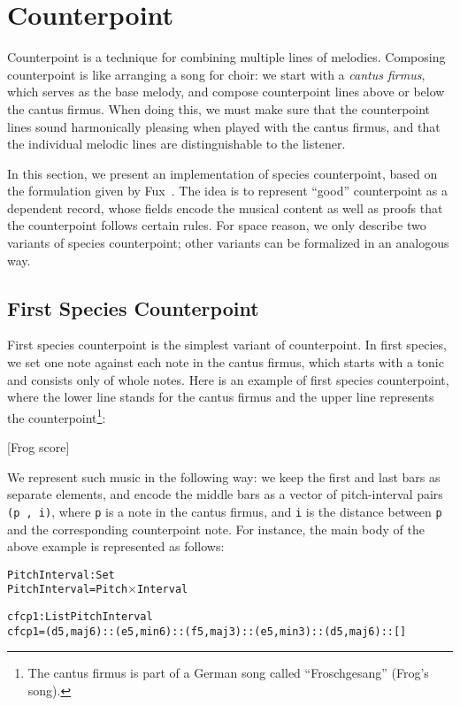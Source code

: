 \section{Counterpoint}
\label{sec:cp}

Counterpoint is a technique for combining multiple lines of melodies.
Composing counterpoint is like arranging a song for choir:
we start with a \emph{cantus firmus}, which serves as the base melody,
and compose counterpoint lines above or below the cantus firmus.
When doing this, we must make sure that the counterpoint lines sound
harmonically pleasing when played with the cantus firmus,
and that the individual melodic lines are distinguishable to the listener.

In this section, we present an implementation of species counterpoint,
based on the formulation given by Fux~\citep{fux-cp}.
The idea is to represent ``good'' counterpoint  as a dependent record,
whose fields encode the musical content as well as proofs that the
counterpoint follows certain rules.
For space reason, we only describe two variants of species counterpoint;
other variants can be formalized in an analogous way.

\subsection{First Species Counterpoint}
\label{sec:cp:fs}

First species counterpoint is the simplest variant of counterpoint.
In first species, we set one note against each note in the cantus firmus,
which starts with a tonic and consists only of whole notes.
Here is an example of first species counterpoint, where the lower line
stands for the cantus firmus and the upper line represents the
counterpoint\footnote{The cantus firmus is part of a German song
  called ``Froschgesang'' (Frog's song).}:

[Frog score]

We represent such music in the following way: we keep the first and
last bars as separate elements, and encode the middle bars as a vector
of pitch-interval pairs \texttt{(p , i)}, where \texttt{p} is a note in the
cantus firmus, and \texttt{i} is the distance between \texttt{p} and the
corresponding counterpoint note.
For instance, the main body of the above example is represented as
follows:

\begin{alltt}
PitchInterval : Set
PitchInterval = Pitch \(\times\) Interval

cfcp1 : List PitchInterval
cfcp1 = (d 5 , maj6) :: (e 5 , min6) :: (f 5 , maj3) :: (e 5 , min3) :: (d 5 , maj6) :: []
\end{alltt}

